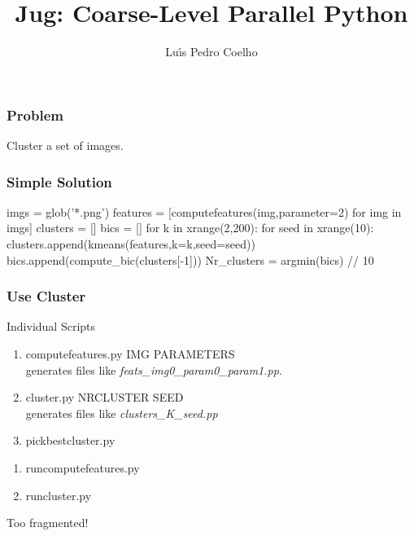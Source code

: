 \documentclass{beamer}
\title{Jug: Coarse-Level Parallel Python}
\author{Lu\'\i{}s Pedro Coelho}
\institute{Joint \textsc{cmu}-Pitt PhD.\ in Computational Biology}
\begin{document}
\frame{\titlepage}
\begin{frame}[fragile]
\frametitle{Problem}
Cluster a set of images.
\end{frame}

\begin{frame}[fragile]
\frametitle{Simple Solution}

\begin{python}
imgs = glob('*.png')
features = [computefeatures(img,parameter=2)
                for img in imgs]
clusters = []
bics = []
for k in xrange(2,200):
    for seed in xrange(10):
        clusters.append(kmeans(features,k=k,seed=seed))
        bics.append(compute_bic(clusters[-1]))
Nr_clusters = argmin(bics) // 10
\end{python}
\end{frame}

\begin{frame}[fragile]
\frametitle{Use Cluster}

\begin{block}{Individual Scripts}
\begin{enumerate}
\item computefeatures.py IMG PARAMETERS\\
    generates files like \textit{feats_img0_param0_param1.pp}.
\item cluster.py NRCLUSTER SEED\\
    generates files like \textit{clusters_K_seed.pp}
\item pickbestcluster.py
\end{enumerate}
\pause
\begin{enumerate}
\item runcomputefeatures.py
\item runcluster.py
\end{enumerate}
\end{block}

Too fragmented!
\end{frame}
\end{document}
